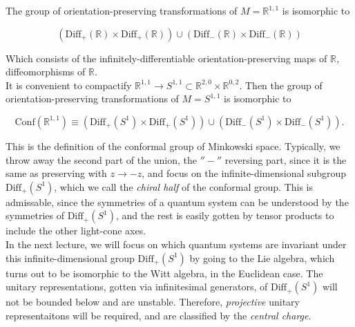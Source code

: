 \documentclass[10pt]{article}
\begin{document}
\noindent The group of orientation-preserving transformations of $M=\mathbb{R}^{1,1}$ is isomorphic to 

\begin{equation}
(\text{Diff}_+ (\mathbb{R}) \times \text{Diff}_+ (\mathbb{R})) \cup (\text{Diff}_- (\mathbb{R}) \times \text{Diff}_- (\mathbb{R}))
\end{equation}

\noindent Which consists of the infinitely-differentiable orientation-preserving maps of $\mathbb{R}$, diffeomorphisms of $\mathbb{R}$. \\

\noindent It is convenient to compactify $\mathbb{R}^{1,1} \rightarrow S^{1,1} \subset \mathbb{R}^{2,0} \times \mathbb{R}^{0,2}$. Then the group of orientation-preserving transformations of $M=S^{1,1}$ is isomorphic to 

\begin{equation}
\text{Conf} (\mathbb{R}^{1,1}) \equiv (\text{Diff}_+ (S^1) \times \text{Diff}_+ (S^1)) \cup (\text{Diff}_- (S^1) \times \text{Diff}_- (S^1)).
\end{equation}

\noindent This is the definition of the conformal group of Minkowski space. Typically, we throw away the second part of the union, the $''-''$ reversing part, since it is the same as preserving with $z \rightarrow -z$, and focus on the infinite-dimensional subgroup $\text{Diff}_+ (S^1)$, which we call the \textit{chiral half} of the conformal group. This is admissable, since the symmetries of a quantum system can be understood by the symmetries of $\text{Diff}_+ (S^1)$, and the rest is easily gotten by tensor products to include the other light-cone axes. \\

\noindent In the next lecture, we will focus on which quantum systems are invariant under this infinite-dimensional group $\text{Diff}_+ (S^1)$ by going to the Lie algebra, which turns out to be isomorphic to the Witt algebra, in the Euclidean case. The unitary representations, gotten via infinitesimal generators, of $\text{Diff}_+ (S^1)$ will not be bounded below and are unstable. Therefore, \textit{projective} unitary representaitons will be required, and are classified by the \textit{central charge}.

%

\end{document}
